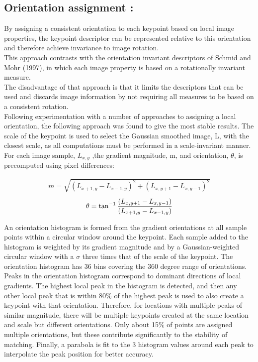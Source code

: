 \subsection{Orientation assignment :}
By assigning a consistent orientation to each keypoint based on local image properties,
the keypoint descriptor can be represented relative to this orientation and therefore achieve
invariance to image rotation.\\ This approach contrasts with the orientation invariant descriptors
of Schmid and Mohr (1997), in which each image property is based on a rotationally
invariant measure.\\ The disadvantage of that approach is that it limits the descriptors that
can be used and discards image information by not requiring all measures to be based on a
consistent rotation.\\

Following experimentation with a number of approaches to assigning a local orientation,
the following approach was found to give the most stable results. The scale of the
keypoint is used to select the Gaussian smoothed image, L, with the closest scale, as all
computations must be performed in a scale-invariant manner. For each image sample, $L_{x,y}$ ,the gradient magnitude, m, and orientation, $\theta$, is precomputed using pixel differences:

\begin{align}
 m  =\sqrt{(L_{x+1,y} - L_{x-1,y})^2 + (L_{x,y+1} - L_{x,y-1})^2}
\end{align}
\begin{align}
  \theta = \tan^{\small{-1}}\frac{(L_{x,y+1} - L_{x,y-1})}{(L_{x+1,y} - L_{x-1,y})}
\end{align}

An orientation histogram is formed from the gradient orientations at all sample points
within a circular window around the keypoint. Each sample added to the histogram is
weighted by its gradient magnitude and by a Gaussian-weighted circular window with a $\sigma$
three times that of the scale of the keypoint. The orientation histogram has 36 bins covering
the 360 degree range of orientations.
Peaks in the orientation histogram correspond to dominant directions of local gradients.
The highest local peak in the histogram is detected, and then any other local peak that is
within 80\% of the highest peak is used to also create a keypoint with that orientation.
Therefore, for locations with multiple peaks of similar magnitude, there will be multiple
keypoints created at the same location and scale but different orientations. Only about
15\% of points are assigned multiple orientations, but these contribute signiﬁcantly to the
stability of matching. Finally, a parabola is ﬁt to the 3 histogram values around each peak
to interpolate the peak position for better accuracy.

